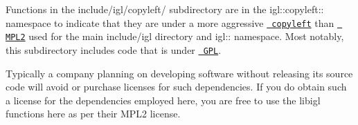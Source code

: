 Functions in the {\ttfamily include/igl/copyleft/} subdirectory are in the {\ttfamily igl\+::copyleft\+:\+:} namespace to indicate that they are under a more aggressive \href{https://en.wikipedia.org/wiki/Copyleft}{\texttt{ copyleft}} than \href{https://en.wikipedia.org/wiki/Mozilla_Public_License}{\texttt{ MPL2}} used for the main {\ttfamily include/igl} directory and {\ttfamily igl\+:\+:} namespace. Most notably, this subdirectory includes code that is under \href{https://en.wikipedia.org/wiki/GNU_General_Public_License}{\texttt{ GPL}}.

Typically a company planning on developing software without releasing its source code will avoid or purchase licenses for such dependencies. If you do obtain such a license for the dependencies employed here, you are free to use the libigl functions here as per their MPL2 license. 